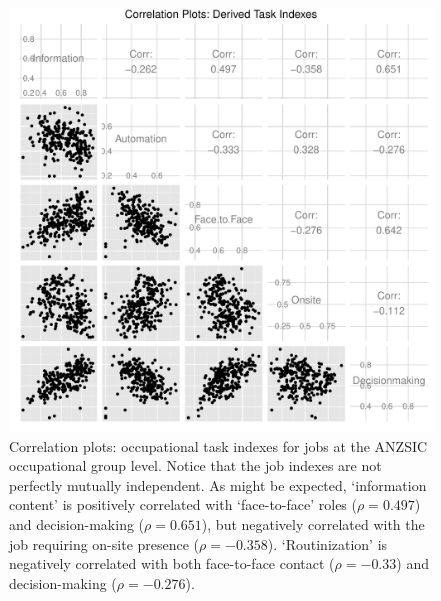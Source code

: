 \begin{figure}[ht]
  \centering
  \includegraphics[width=\textwidth]{../figure/correl.pdf}
  \caption{Correlation plots: occupational task indexes for jobs at the ANZSIC occupational group level. Notice that the job indexes are not perfectly mutually independent. As might be expected, `information content' is positively correlated with `face-to-face' roles ($\rho=0.497$) and decision-making ($\rho=0.651$), but negatively correlated with the job requiring on-site presence ($\rho=-0.358$). `Routinization' is negatively correlated with both face-to-face contact ($\rho=-0.33$) and decision-making ($\rho=-0.276$).}
  \label{fig:correl}
\end{figure}

